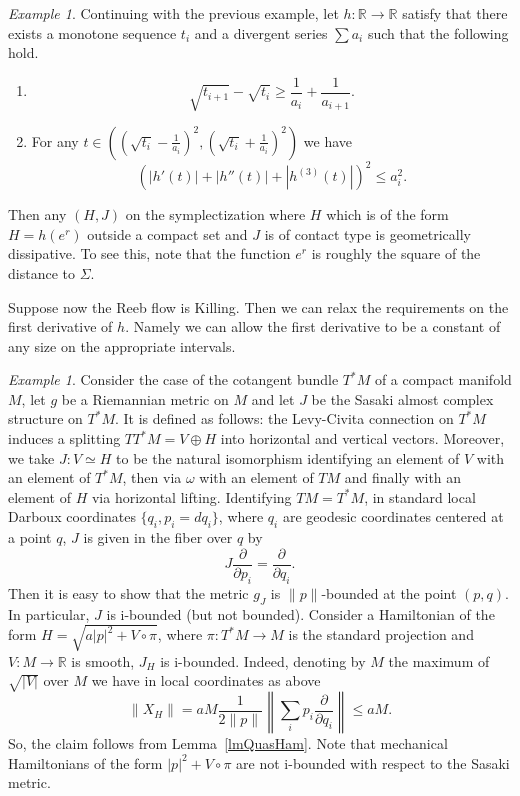 \documentclass[11pt]{amsart}
\newcommand{\R}{\mathbb{R}}
\theoremstyle{definition}
\theoremstyle{remark}
\newtheorem{ex}[tm]{Example}
\begin{document}
\begin{ex}\label{wxAdmWT}
Continuing with the previous example, let $h:\R\to\R$ satisfy that there exists a monotone sequence $t_i$ and a divergent series $\sum a_i$ such that the following hold.

\begin{enumerate}
\item
\[
\sqrt{t_{i+1}}-\sqrt{t_i}\geq \frac{1}{a_i}+\frac{1}{a_{i+1}}.
\]
\item
For any $t\in \left(\left(\sqrt{t_{i}}-\frac1{a_i}\right)^2,\left(\sqrt{t_i}+\frac1{a_i}\right)^2\right)$ we have
\[
\left(|h'(t)|+|h''(t)|+|h^{(3)}(t)|\right)^2\leq a_{i}^2 .
\]
\end{enumerate}
Then any $(H,J)$  on the symplectization where $H$ which is of the form $H=h(e^r)$ outside a compact set and $J$ is of contact type is geometrically dissipative. To see this, note that the function $e^r$ is roughly the square of the distance to $\Sigma$.

Suppose now the Reeb flow is Killing. Then we can relax the requirements on the first derivative of $h$. Namely we can allow the first derivative to be a constant of any size on the appropriate intervals.
\end{ex}
\begin{ex}
Consider the case of the cotangent bundle $T^*M$ of a compact manifold $M$, let $g$ be a Riemannian metric on $M$ and let $J$ be the Sasaki almost complex structure on $T^*M$. It is defined as follows: the Levy-Civita connection on $T^*M$ induces a splitting $TT^*M=V\oplus H$ into horizontal and vertical vectors. Moreover, we take  $J:V\simeq H$ to be the natural isomorphism identifying an element of $V$ with an element of $T^*M$, then via $\omega$ with an element of $TM$ and finally with an element of $H$ via horizontal lifting. Identifying $TM=T^*M$, in standard local Darboux coordinates $\{q_i,p_i=dq_i\}$, where $q_i$ are geodesic coordinates centered at a point $q$, $J$ is given in the fiber over $q$ by
\[
J\frac{\partial}{\partial p_i}=\frac{\partial}{\partial q_i}.
\]
Then it is easy to show that the metric $g_J$ is $\|p\|$-bounded at the point $(p,q)$. In particular, $J$ is i-bounded (but not bounded). Consider a Hamiltonian of the form  $H=\sqrt{a|p|^2+V\circ\pi}$, where $\pi:T^*M\to M$ is the standard projection and $V:M\to\R$ is smooth, $J_H$ is i-bounded. Indeed, denoting by $M$ the maximum of $\sqrt{|V|}$ over $M$ we have in local coordinates as above
\[
\|X_H\|=aM\frac1{2\|p\|}\left\|\sum_ip_i\frac{\partial}{\partial q_i}\right\|\leq aM.
\]
So, the claim follows from Lemma~\ref{lmQuasHam}. Note that mechanical Hamiltonians of the form $|p|^2+V\circ\pi$ are not i-bounded with respect to the Sasaki metric.

\end{ex}
\end{document}
